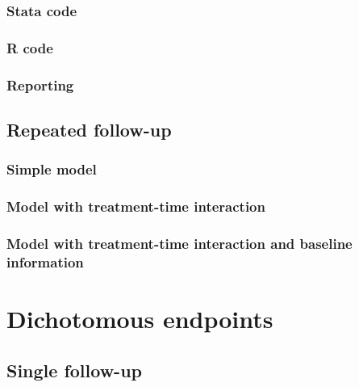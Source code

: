 \documentclass[]{book}
\begin{document}
\hypertarget{stata-code}{%
\subsection{Stata code}\label{stata-code}}

\hypertarget{r-code}{%
\subsection{R code}\label{r-code}}

\hypertarget{reporting}{%
\subsection{Reporting}\label{reporting}}

\hypertarget{repeated-follow-up}{%
\section{Repeated follow-up}\label{repeated-follow-up}}

\hypertarget{simple-model}{%
\subsection{Simple model}\label{simple-model}}

\hypertarget{model-with-treatment-time-interaction}{%
\subsection{Model with treatment-time interaction}\label{model-with-treatment-time-interaction}}

\hypertarget{model-with-treatment-time-interaction-and-baseline-information}{%
\subsection{Model with treatment-time interaction and baseline information}\label{model-with-treatment-time-interaction-and-baseline-information}}

\hypertarget{dichotomous-endpoints}{%
\chapter{Dichotomous endpoints}\label{dichotomous-endpoints}}

\hypertarget{single-follow-up-1}{%
\section{Single follow-up}\label{single-follow-up-1}}
\end{document}
